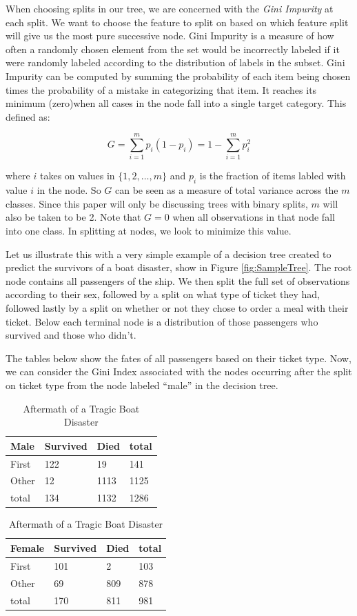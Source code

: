 \documentclass[preprint,12pt]{elsarticle}
\begin{document}
When choosing splits in our tree, we are concerned with the \textit{Gini Impurity} at each split. We want to choose the feature to split on based on which feature split will give us the most pure successive node. Gini Impurity is a measure of how often a randomly chosen element from the set would be incorrectly labeled if it were randomly labeled according to the distribution of labels in the subset. Gini Impurity can be computed by summing the probability of each item being chosen times the probability of a mistake in categorizing that item. It reaches its minimum (zero)when all cases in the node fall into a single target category. This defined as:

$$G = \sum\limits_{i=1}^m p_{i}(1-p_{i}) = 1 - \sum\limits_{i=1}^m p_{i}^{2}$$

\noindent where $i$ takes on values in $\{1,2,\ldots,m\}$ and $p_i$ is the fraction of items labled with value $i$ in the node. So $G$ can be seen as a measure of total variance across the $m$ classes. Since this paper will only be discussing trees with binary splits, $m$ will also be taken to be 2. Note that $G = 0$ when all observations in that node fall into one class. In splitting at nodes, we look to minimize this value.

Let us illustrate this with a very simple example of a decision tree created to predict the survivors of a boat disaster, show in Figure \ref{fig:SampleTree}. The root node contains all passengers of the ship. We then split the full set of observations according to their sex, followed by a split on what type of ticket they had, followed lastly by a split on whether or not they chose to order a meal with their ticket. Below each terminal node is a distribution of those passengers who survived and those who didn't. 

The tables below show the fates of all passengers based on their ticket type. Now, we can consider the Gini Index associated with the nodes occurring after the split on ticket type from the node labeled ``male'' in the decision tree.

\begin{table}[h]
\begin{tabular}{|l | l l | l|}
\hline
 Male & Survived & Died & total\\
\hline
First & 122 & 19 & 141 \\
Other & 12 & 1113 & 1125 \\
\hline
total & 134 & 1132 & 1286 \\
\hline
\end{tabular}
\quad
\begin{tabular}{|l | l l | l|}
\hline
Female & Survived & Died & total\\
\hline
First & 101 & 2 & 103 \\
Other & 69 & 809 & 878 \\
\hline
total & 170 & 811 & 981 \\
\hline
\end{tabular}

\caption{Aftermath of a Tragic Boat Disaster}
\end{table}
\end{document}
